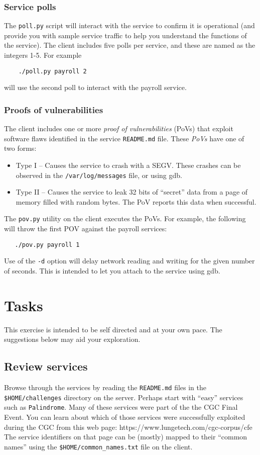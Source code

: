 \subsubsection{Service polls}
The {\tt poll.py}
script will interact with the service to confirm it is operational (and provide you with sample
service traffic to help you understand the functions of the service).  The client includes five
polls per service, and these are named as the integers 1-5.  For example
{\begin{verbatim}
    ./poll.py payroll 2
\end{verbatim}
\noindent will use the second poll to interact with the payroll service.

\subsubsection{Proofs of vulnerabilities}
The client includes one or more \textit{proof of vulnerabilities} (PoVs) that exploit software flaws
identified in the service {\tt README.md} file.  These \textit{PoVs} have one of two forms:
\begin{itemize}
\item Type I -- Causes the service to crash with a SEGV.  These crashes can be observed in the
{\tt /var/log/messages} file, or using gdb.
\item Type II -- Causes the service to leak 32 bits of ``secret'' data from a page of memory filled
with random bytes.  The PoV reports this data when successful.
\end{itemize}
\noindent The {\tt pov.py} utility on the client executes the PoVs.
For example, the following will throw the first POV against the payroll services:
\begin{verbatim}
   ./pov.py payroll 1
\end{verbatim}
\noindent Use of the {\tt -d} option will delay network reading and writing for the given
number of seconds.  This is intended to let you attach to the service using gdb.

\section{Tasks}
This exercise is intended to be self directed and at your own pace.  The suggestions below may aid
your exploration.

\subsection{Review services}
Browse through the services by reading the {\tt README.md} files in the {\tt \$HOME/challenges} directory
on the server.  Perhaps start with ``easy'' services such as {\tt Palindrome}.  Many of these
services were part of the the CGC Final Event.  You can learn about which of those services
were successfully exploited during the CGC from this web page:
https://www.lungetech.com/cgc-corpus/cfe   The service identifiers on that page can be 
(mostly) mapped to their ``common names'' using the {\tt \$HOME/common\_names.txt} file on the client.

}
